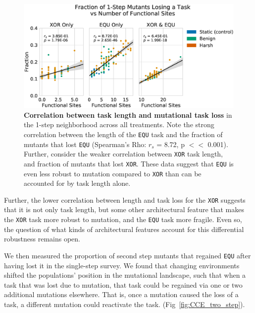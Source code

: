 \documentclass[10pt,letterpaper,final]{article}
\begin{document}
	\begin{figure}[!h] %
	\includegraphics[width=0.95\columnwidth]{figures/CE/fig11.eps}
	\caption{\textbf{Correlation between task length and mutational task loss} in the 1-step neighborhood across all treatments. Note the strong correlation between the length of the \texttt{EQU} task and the fraction of mutants that lost \texttt{EQU} (Spearman's Rho: $r_s$ = 8.72, p $<<$ 0.001). Further, consider the weaker correlation between \texttt{XOR} task length, and fraction of mutants that lost \texttt{XOR}. These data suggest that \texttt{EQU} is even less robust to mutation compared to \texttt{XOR} than can be accounted for by task length alone.  
	}\label{fig:CCE_func_vs_single_step}
	\end{figure}	

Further, the lower correlation between length and task loss for the \texttt{XOR} suggests that it is not only task length, but some other architectural feature that makes the \texttt{XOR} task more robust to mutation, and the \texttt{EQU} task more fragile. Even so, the question of what kinds of architectural features account for this differential robustness remains open.

We then measured the proportion of second step mutants that regained \texttt{EQU} after having lost it in the single-step survey. We found that changing environments shifted the populations' position in the mutational landscape, such that when a task that was lost due to mutation, that task could be regained via one or two additional mutations elsewhere. That is, once a mutation caused the loss of a task, a different mutation could reactivate the task. (Fig~\ref{fig:CCE_two_step}). 
\end{document}
